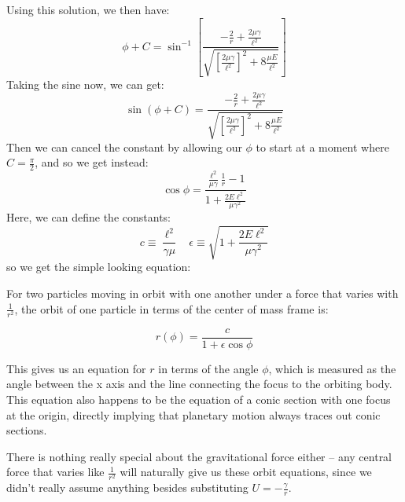 Using this solution, we then have: 
\[ \phi + C = \sin^{-1}\left[\frac{-\frac{2}{r} + 
\frac{2\mu \gamma}{\ell^2}}{\sqrt{\left[\frac{2\mu\gamma}{\ell^2}\right]^2+ 8 \frac{\mu E}{\ell^2}}}\right]\] 
Taking the sine now, we can get: 
\[ \sin(\phi + C) = \frac{-\frac{2}{r} + 
\frac{2\mu \gamma}{\ell^2}}{\sqrt{\left[\frac{2\mu\gamma}{\ell^2}\right]^2 + 8 \frac{\mu E}{\ell^2}} }\]
Then we can cancel the constant by allowing our $\phi$ to start at a moment where $C = \frac{\pi}{2}$, and so we
get instead: 
\[ \cos \phi = \frac{\frac{\ell^2}{\mu \gamma}\frac{1}{r}-1}{1 + \frac{2E\ell^2}{\mu \gamma^2}}\]
Here, we can define the constants: 
\[ c \equiv \frac{\ell^2}{\gamma \mu} \ \ \ \ \epsilon \equiv \sqrt{1 + \frac{2E\ell^2}{\mu \gamma^2}} \]
so we get the simple looking equation: %
\begin{theorem*}{}
		For two particles moving in orbit with one another under a force that varies with $\frac{1}{r^2}$, the 
		orbit of one particle in terms of the center of mass frame is:

		\[ r(\phi) = \frac{c}{1+\epsilon \cos \phi}\]
		
\end{theorem*}
This gives us an equation for $r$ in terms of the angle $\phi$, which is measured as the angle between the x axis
and the line connecting the focus to the orbiting body. This equation also happens to be the equation of a conic
section with one focus at the origin, directly implying that planetary motion always traces out conic sections. 
\begin{insight*}{}
		There is nothing really special about the gravitational force either -- any central force that varies like
		$\frac{1}{r^2}$ will naturally give us these orbit equations, since we didn't really assume anything 
		besides substituting $U = -\frac{\gamma}{r}$.
\end{insight*}
